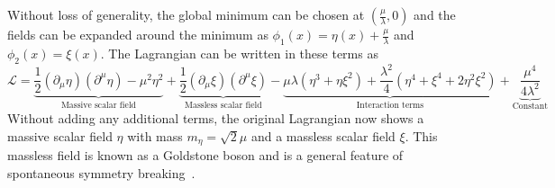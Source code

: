 Without loss of generality, the global minimum can be chosen at $(\frac{\mu}{\lambda},0)$ and the fields can be expanded around the minimum as $\phi_1(x)=\eta(x)+\frac{\mu}{\lambda}$ and $\phi_2(x)=\xi(x)$. The Lagrangian can be written in these terms as
\begin{equation}
	\mathcal{L}=\underbrace{\frac{1}{2}(\partial_\mu\eta)(\partial^\mu\eta)-\mu^2\eta^2}_\text{Massive scalar field}+\underbrace{\frac{1}{2}(\partial_\mu\xi)(\partial^\mu\xi)}_\text{Massless scalar field}-\underbrace{\mu\lambda(\eta^3+\eta\xi^2)+\frac{\lambda^2}{4}(\eta^4+\xi^4+2\eta^2\xi^2)}_\text{Interaction terms} + \underbrace{\frac{\mu^4}{4\lambda^2}}_\text{Constant}
\end{equation}
Without adding any additional terms, the original Lagrangian now shows a massive scalar field $\eta$ with mass $m_\eta=\sqrt{2}\mu$ and a massless scalar field $\xi$. This massless field is known as a Goldstone boson and is a general feature of spontaneous symmetry breaking~\cite{goldstone}.

